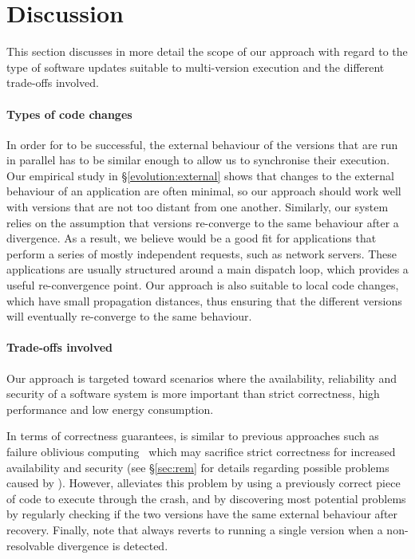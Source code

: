 \section{Discussion}
\label{safe-updates:discussion}

This section discusses in more detail the scope of our approach with
regard to the type of software updates suitable to multi-version
execution and the different trade-offs involved.


\paragraph{Types of code changes} In order for \mx to be successful, the
external behaviour of the versions that are run in parallel has to be similar
enough to allow us to synchronise their execution.  Our empirical study in
\S\ref{evolution:external} shows that changes to the external behaviour of
an application are often minimal, so our approach should work well with
versions that are not too distant from one another.  Similarly, our system
relies on the assumption that versions re-converge to the same behaviour after
a divergence.  As a result, we believe \mx would be a good fit for applications
that perform a series of mostly independent requests, such as network servers.
These applications are usually structured around a main dispatch loop, which
provides a useful re-convergence point.  Our approach is also suitable to local
code changes, which have small propagation distances, thus ensuring that the
different versions will eventually re-converge to the same behaviour.

\paragraph{Trade-offs involved} Our approach is targeted toward scenarios
where the availability, reliability and security of a software system is more
important than strict correctness, high performance and low energy consumption.  

In terms of correctness guarantees, \mx is similar to previous approaches such
as failure oblivious computing~\cite{fo} which may sacrifice strict correctness
for increased availability and security (see \S\ref{sec:rem} for details
regarding possible problems caused by \mx).  However, \mx alleviates this
problem by using a previously correct piece of code to execute through the
crash, and by discovering most potential problems by regularly checking if the
two versions have the same external behaviour after recovery.  Finally, note
that \mx always reverts to running a single version when a non-resolvable
divergence is detected.

